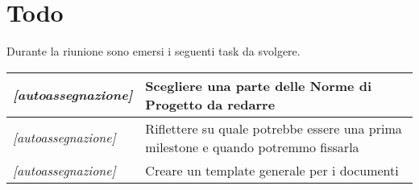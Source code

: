 \section{Todo}
Durante la riunione sono emersi i seguenti task da svolgere.

\begin{center}
  \begin{tabular}{|p{5cm}|p{7cm}|}
    \hline
    \textit{[autoassegnazione]} & Scegliere una parte delle Norme di Progetto da redarre  \\ \hline
    \textit{[autoassegnazione]} & Riflettere su quale potrebbe essere una prima milestone e quando potremmo fissarla  \\ \hline
    \textit{[autoassegnazione]} & Creare un template generale per i documenti  \\ \hline
  \end{tabular}
\end{center}
